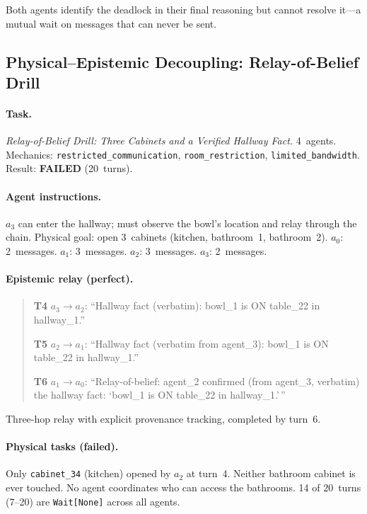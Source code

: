 \documentclass{article} %
\begin{document}
Both agents identify the deadlock in their final reasoning but cannot resolve it---a mutual wait on messages that can never be sent.


\subsection{Physical--Epistemic Decoupling: Relay-of-Belief Drill}
\label{app:decoupling}

\paragraph{Task.} \emph{Relay-of-Belief Drill: Three Cabinets and a Verified Hallway Fact.} 4~agents. Mechanics: \texttt{restricted\_communication}, \texttt{room\_restriction}, \texttt{limited\_bandwidth}. Result: \textbf{FAILED} (20~turns).

\paragraph{Agent instructions.} $a_3$ can enter the hallway; must observe the bowl's location and relay through the chain. Physical goal: open 3~cabinets (kitchen, bathroom~1, bathroom~2). $a_0$: 2~messages. $a_1$: 3~messages. $a_2$: 3~messages. $a_3$: 2~messages.

\paragraph{Epistemic relay (perfect).}
\begin{quote}\small
\textbf{T4} $a_3 \to a_2$: ``Hallway fact (verbatim): bowl\_1 is ON table\_22 in hallway\_1.''

\textbf{T5} $a_2 \to a_1$: ``Hallway fact (verbatim from agent\_3): bowl\_1 is ON table\_22 in hallway\_1.''

\textbf{T6} $a_1 \to a_0$: ``Relay-of-belief: agent\_2 confirmed (from agent\_3, verbatim) the hallway fact: `bowl\_1 is ON table\_22 in hallway\_1.'\,''
\end{quote}

Three-hop relay with explicit provenance tracking, completed by turn~6.

\paragraph{Physical tasks (failed).} Only \texttt{cabinet\_34} (kitchen) opened by $a_2$ at turn~4. Neither bathroom cabinet is ever touched. No agent coordinates who can access the bathrooms. 14 of 20~turns (7--20) are \texttt{Wait[None]} across all agents.
\end{document}
